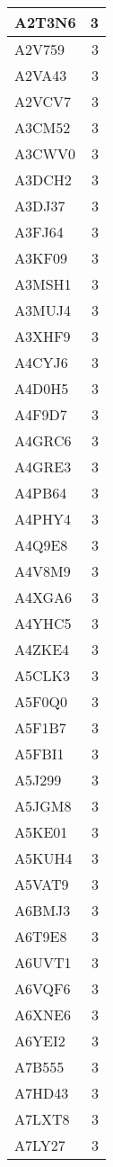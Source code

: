 \documentclass[
]{book}
\theoremstyle{definition}
\theoremstyle{definition}
\theoremstyle{definition}
\theoremstyle{definition}
\theoremstyle{remark}
\begin{document}
\begin{table}
\begin{tabular}{l|r}
A2T3N6 & 3\\
\hline
A2V759 & 3\\
\hline
A2VA43 & 3\\
\hline
A2VCV7 & 3\\
\hline
A3CM52 & 3\\
\hline
A3CWV0 & 3\\
\hline
A3DCH2 & 3\\
\hline
A3DJ37 & 3\\
\hline
A3FJ64 & 3\\
\hline
A3KF09 & 3\\
\hline
A3MSH1 & 3\\
\hline
A3MUJ4 & 3\\
\hline
A3XHF9 & 3\\
\hline
A4CYJ6 & 3\\
\hline
A4D0H5 & 3\\
\hline
A4F9D7 & 3\\
\hline
A4GRC6 & 3\\
\hline
A4GRE3 & 3\\
\hline
A4PB64 & 3\\
\hline
A4PHY4 & 3\\
\hline
A4Q9E8 & 3\\
\hline
A4V8M9 & 3\\
\hline
A4XGA6 & 3\\
\hline
A4YHC5 & 3\\
\hline
A4ZKE4 & 3\\
\hline
A5CLK3 & 3\\
\hline
A5F0Q0 & 3\\
\hline
A5F1B7 & 3\\
\hline
A5FBI1 & 3\\
\hline
A5J299 & 3\\
\hline
A5JGM8 & 3\\
\hline
A5KE01 & 3\\
\hline
A5KUH4 & 3\\
\hline
A5VAT9 & 3\\
\hline
A6BMJ3 & 3\\
\hline
A6T9E8 & 3\\
\hline
A6UVT1 & 3\\
\hline
A6VQF6 & 3\\
\hline
A6XNE6 & 3\\
\hline
A6YEI2 & 3\\
\hline
A7B555 & 3\\
\hline
A7HD43 & 3\\
\hline
A7LXT8 & 3\\
\hline
A7LY27 & 3\\

\end{tabular}
\end{table}
\end{document}
